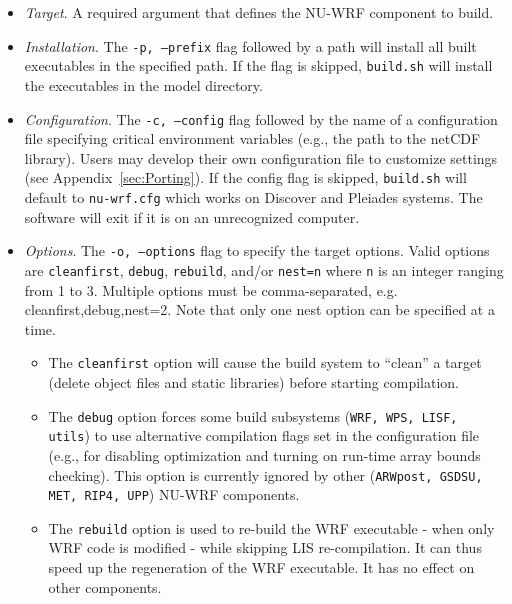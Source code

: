 \begin{itemize}

 \item \textit{Target}. A required argument that defines the NU-WRF component to build.

 \item \textit{Installation}. The \texttt{-p, --prefix} flag followed by a path 
    will install all built executables in the specified path. If the flag is skipped,
    \texttt{build.sh} will install the executables in the model directory.

 \item \textit{Configuration}. The \texttt{-c, --config} flag followed by the name
  of a configuration file specifying critical environment variables (e.g., the
  path to the netCDF library). Users may develop their own configuration 
  file to customize settings (see Appendix~\ref{sec:Porting}). If the 
  config flag is skipped, \texttt{build.sh} will default to 
   \texttt{nu-wrf.cfg} which works on Discover and Pleiades systems.
   The software will exit if it is on an unrecognized computer. 

\item \textit{Options}. The \texttt{-o, --options} flag to specify the target options. 
Valid options are \texttt{cleanfirst}, 
  \texttt{debug}, \texttt{rebuild}, and/or \texttt{nest=n} where \texttt{n} is an integer 
  ranging from 1 to 3. Multiple options must be comma-separated,
   e.g. cleanfirst,debug,nest=2. Note that only one nest option can be specified at a time.
   
  \begin{itemize} 
  
    \item The \texttt{cleanfirst} option will cause the build system to
      ``clean'' a target (delete object files and static libraries) before 
      starting compilation. 

    \item The \texttt{debug} option forces some build subsystems 
    (\texttt{WRF, WPS, LISF, utils}) to use alternative compilation flags set 
      in the configuration file (e.g., for disabling optimization and turning 
      on run-time array bounds checking). This option is currently ignored by 
      other (\texttt{ARWpost, GSDSU, MET, RIP4, UPP})  NU-WRF components.

    \item The \texttt{rebuild} option is used to re-build the WRF executable - when only 
    WRF code is modified - while skipping LIS re-compilation. It can thus speed up the 
    regeneration of the WRF executable. It has no effect on other components.
               

\end{itemize}
\end{itemize}
